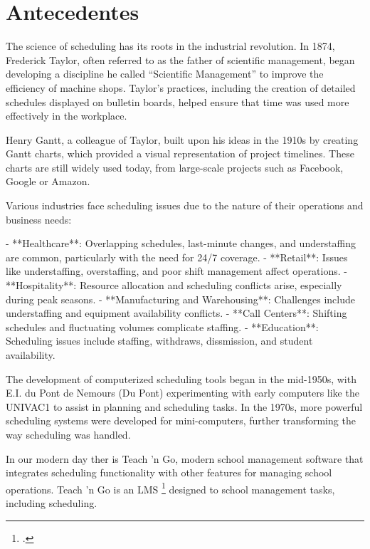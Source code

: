 \section{Antecedentes}

The science of scheduling has its roots in the industrial revolution. In 1874, Frederick Taylor, often referred to as the father of scientific management, began developing a discipline he called “Scientific Management” to improve the efficiency of machine shops. Taylor’s practices, including the creation of detailed schedules displayed on bulletin boards, helped ensure that time was used more effectively in the workplace.

Henry Gantt, a colleague of Taylor, built upon his ideas in the 1910s by creating Gantt charts, which provided a visual representation of project timelines. These charts are still widely used today, from large-scale projects such as Facebook, Google or Amazon.

Various industries face scheduling issues due to the nature of their operations and business needs:

- **Healthcare**: Overlapping schedules, last-minute changes, and understaffing are common, particularly with the need for 24/7 coverage.
- **Retail**: Issues like understaffing, overstaffing, and poor shift management affect operations.
- **Hospitality**: Resource allocation and scheduling conflicts arise, especially during peak seasons.
- **Manufacturing and Warehousing**: Challenges include understaffing and equipment availability conflicts.
- **Call Centers**: Shifting schedules and fluctuating volumes complicate staffing.
- **Education**: Scheduling issues include staffing, withdraws, dissmission, and student availability.


The development of computerized scheduling tools began in the mid-1950s, with E.I. du Pont de Nemours (Du Pont) experimenting with early computers like the UNIVAC1 to assist in planning and scheduling tasks. In the 1970s, more powerful scheduling systems were developed for mini-computers, further transforming the way scheduling was handled.

In our modern day ther is Teach 'n Go, modern school management software that integrates scheduling functionality with other features for managing school operations. Teach 'n Go is an LMS \footcite{LMS (Learning Management System)} designed to school management tasks, including scheduling.

